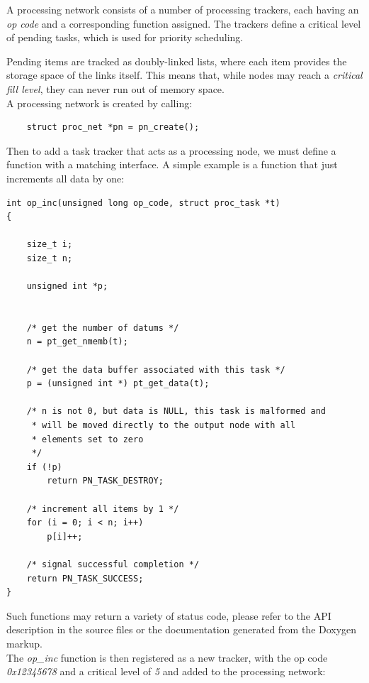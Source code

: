 \noindent
A processing network consists of a number of processing trackers, each having
an \emph{op code} and a corresponding function assigned. The trackers define
a critical level of pending tasks, which is used for priority scheduling.

Pending items are tracked as doubly-linked lists, where each item provides the
storage space of the links itself. This means that, while nodes may reach a
\emph{critical fill level}, they can never run out of memory space.
\\

\noindent
A processing network is created by calling:

\begin{lstlisting}
	struct proc_net *pn = pn_create();
\end{lstlisting}

\noindent
Then to add a task tracker that acts as a processing node, we must define a
function with a matching interface. A simple example is a function
that just increments all data by one:

\begin{minipage}{\linewidth}
\begin{lstlisting}
int op_inc(unsigned long op_code, struct proc_task *t)
{

	size_t i;
	size_t n;

	unsigned int *p;


	/* get the number of datums */
	n = pt_get_nmemb(t);

	/* get the data buffer associated with this task */
	p = (unsigned int *) pt_get_data(t);

	/* n is not 0, but data is NULL, this task is malformed and
	 * will be moved directly to the output node with all
	 * elements set to zero
	 */
	if (!p)	
		return PN_TASK_DESTROY;

	/* increment all items by 1 */
	for (i = 0; i < n; i++)
		p[i]++;

	/* signal successful completion */
	return PN_TASK_SUCCESS;
}
\end{lstlisting}
\end{minipage}

\noindent
Such functions may return a variety of status code, please refer to the
API description in the source files or the documentation generated from the
\gls{Doxygen} markup.
\\

\noindent
The \emph{op\_inc} function is then registered as a new tracker, with the op
code \emph{0x12345678} and a critical level of \emph{5} and added to the
processing network:

